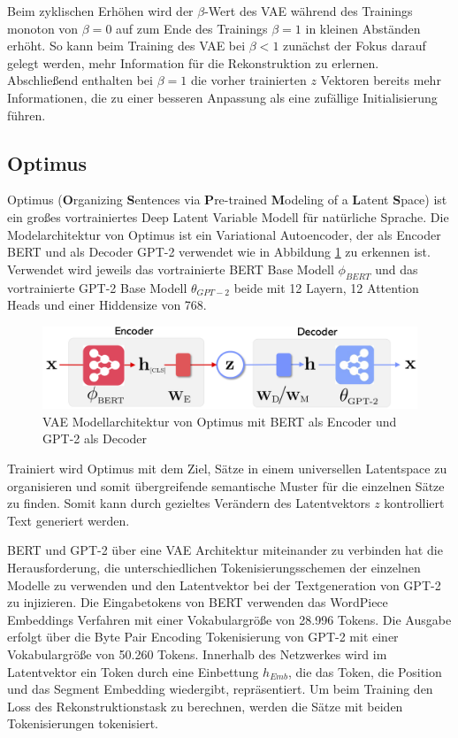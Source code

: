 Beim zyklischen Erhöhen wird der $\beta$-Wert des VAE während des Trainings monoton von $\beta=0$ auf zum Ende des Trainings $\beta=1$ in kleinen Abständen erhöht.
So kann beim Training des VAE bei $\beta<1$ zunächst der Fokus darauf gelegt werden, mehr Information für die Rekonstruktion zu erlernen. 
Abschließend enthalten bei $\beta=1$ die vorher trainierten $z$ Vektoren bereits mehr Informationen, die zu einer besseren Anpassung als eine zufällige Initialisierung führen.



\subsection{Optimus}
Optimus (\textbf{O}rganizing \textbf{S}entences via \textbf{P}re-trained \textbf{M}odeling of a \textbf{L}atent \textbf{S}pace) \citep{DBLP:journals/corr/abs-2004-04092} ist ein großes vortrainiertes Deep Latent Variable Modell für natürliche Sprache.
Die Modelarchitektur von Optimus ist ein Variational Autoencoder, der als Encoder BERT und als Decoder GPT-2 verwendet wie in Abbildung \ref{optimus_scheme_fig} zu erkennen ist. 
Verwendet wird jeweils das vortrainierte BERT Base Modell $\phi_{BERT}$ und das vortrainierte GPT-2 Base Modell $\theta_{GPT-2}$ beide mit 12 Layern, 12 Attention Heads und einer Hiddensize von 768. 
\begin{figure}[h]
    \centering
    \includegraphics[width=\textwidth]{bilder/optimus_scheme}
    \caption{VAE Modellarchitektur von Optimus mit BERT als Encoder und GPT-2 als Decoder \citep{DBLP:journals/corr/abs-2004-04092}}
    \label{optimus_scheme_fig}
\end{figure}
Trainiert wird Optimus mit dem Ziel, Sätze in einem universellen Latentspace zu organisieren und somit übergreifende semantische Muster für die einzelnen Sätze zu finden.
Somit kann durch gezieltes Verändern des Latentvektors $z$ kontrolliert Text generiert werden. %

BERT und GPT-2 über eine VAE Architektur miteinander zu verbinden hat die Herausforderung, die unterschiedlichen Tokenisierungsschemen der einzelnen Modelle zu verwenden und den Latentvektor bei der Textgeneration von GPT-2 zu injizieren. 
Die Eingabetokens von BERT verwenden das WordPiece Embeddings Verfahren \citep{wordpiece} mit einer Vokabulargröße von 28.996 Tokens. 
Die Ausgabe erfolgt über die Byte Pair Encoding Tokenisierung \citep{bytepairencoding} von GPT-2 mit einer Vokabulargröße von 50.260 Tokens. 
Innerhalb des Netzwerkes wird im Latentvektor ein Token durch eine Einbettung $h_{Emb}$, die das Token, die Position und das Segment Embedding wiedergibt, repräsentiert.
Um beim Training den Loss des Rekonstruktionstask zu berechnen, werden die Sätze mit beiden Tokenisierungen tokenisiert.


